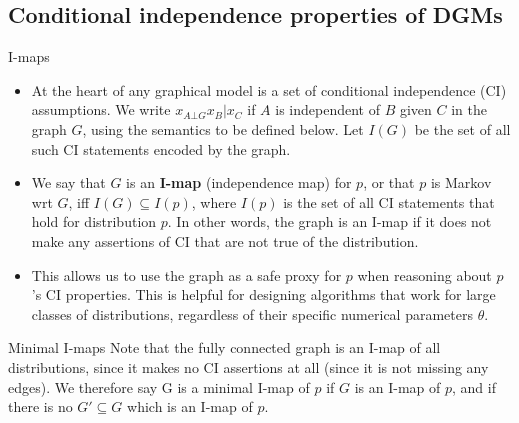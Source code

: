 \documentclass[10pt,mathserif]{beamer}
\begin{document}
\subsection{Conditional independence properties of DGMs}
\begin{frame}{I-maps}
\begin{itemize}
    \item  At the heart of any graphical model is a set of conditional independence (CI) assumptions. We write $x_{A \bot G} x_{B}|x_{C}$ if $A$ is independent of $B$ given $C$ in the graph $G$, using the semantics to be defined below. Let $I(G)$ be the set of all such CI statements encoded by the graph.
    \item  We say that $G$ is an \textbf{I-map }(independence map) for $p$, or that $p$ is Markov wrt $G$, iff $I(G) \subseteq I(p)$, where $I(p)$ is the set of all CI statements that hold for distribution $p$. In other words, the graph is an I-map if it does not make any assertions of CI that are not true of the distribution.
    \item  This allows us to use the graph as a safe proxy for $p$ when reasoning about $p$'s CI properties. This is helpful for designing algorithms that work for large classes of distributions, regardless of their specific numerical parameters $\theta$.
\end{itemize}   
\end{frame}

\begin{frame}{Minimal I-maps}
Note that the fully connected graph is an I-map of all distributions, since it makes no CI assertions at all (since it is not missing any edges). We therefore say G is a minimal I-map of $p$ if $G$ is an I-map of $p$, and if there is no $G'\subseteq G$ which is an I-map of $p$.
\end{frame}
\end{document}
